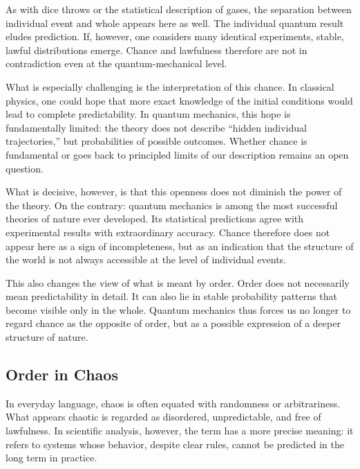 As with dice throws
or the statistical description of gases,
the separation between individual event and whole
appears here as well.
The individual quantum result eludes prediction.
If, however, one considers many identical experiments,
stable, lawful distributions emerge.
Chance and lawfulness
therefore are not in contradiction
even at the quantum-mechanical level.

What is especially challenging
is the interpretation of this chance.
In classical physics, one could hope
that more exact knowledge of the initial conditions
would lead to complete predictability.
In quantum mechanics, this hope is fundamentally limited:
the theory does not describe ``hidden individual trajectories,''
but probabilities of possible outcomes.
Whether chance is fundamental
or goes back to principled limits of our description
remains an open question.

What is decisive, however,
is that this openness
does not diminish the power of the theory.
On the contrary:
quantum mechanics is among the most successful theories of nature ever developed.
Its statistical predictions
agree with experimental results
with extraordinary accuracy.
Chance therefore does not appear here as a sign of incompleteness,
but as an indication
that the structure of the world
is not always accessible at the level of individual events.

This also changes the view of
what is meant by order.
Order does not necessarily mean
predictability in detail.
It can also lie in stable probability patterns
that become visible only in the whole.
Quantum mechanics thus forces us
no longer to regard chance as the opposite of order,
but as a possible expression
of a deeper structure of nature.


\subsection{Order in Chaos}

In everyday language, chaos is often equated with randomness or arbitrariness.
What appears chaotic
is regarded as disordered,
unpredictable,
and free of lawfulness.
In scientific analysis,
however, the term has a more precise meaning:
it refers to systems
whose behavior, despite clear rules,
cannot be predicted in the long term in practice.

